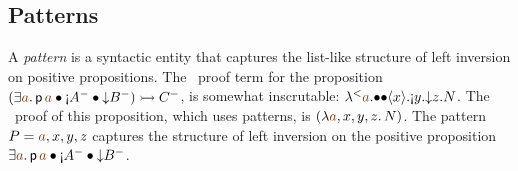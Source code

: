 
\subsection{Patterns}
\label{sec:framework-patterns}


%
A {\it pattern} is a syntactic entity that captures the list-like
structure of left inversion on positive propositions. The \ollll~proof
term for the proposition
%
$(\exists \lf{a}.\,{\sf p}\,\lf{a} 
             \fuse {\gnab}A^-
             \fuse {\downarrow}B^-) \lefti C^-$,
%
is somewhat inscrutable:
${\tlaml{\texistsl{\lf{a}}
    {\tfusel{\tfusel{\tetap{x}{\tgnabl{y}{\tdownl{z}{N}}}}}}}}$. The
\sls~proof of this proposition, which uses patterns, is
$(\lambda \lf{a},x,y,z.\, N)$. The pattern $P = \lf{a}, x,y,z$ captures
the structure of left inversion on the positive proposition 
$\exists \lf{a}.\,{\sf p}\,\lf{a} 
             \fuse {\gnab}A^-
             \fuse {\downarrow}B^-$.

